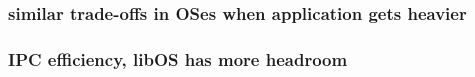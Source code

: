 \subsubsection{similar trade-offs in OSes when application gets heavier}
\label{sec:mcdsilo:dvfstradeoff}

\subsubsection{IPC efficiency, libOS has more headroom}
\label{sec:mcdsilo:ipc}





